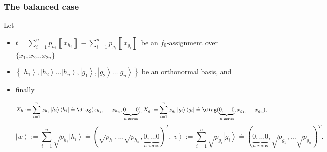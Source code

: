 \documentclass{article}
\begin{document}
\subsubsection{The balanced case}
\label{subsub:balancedf0algebraic}
\begin{proposition}
  \label{prop:balancedf0algeb}
  Let
  \begin{itemize}
    \item $
            t=\sum_{i=1}^{n}p_{h_{i}}\left\llbracket x_{h_{i}}\right\rrbracket -\sum_{i=1}^{n}p_{g_{i}}\left\llbracket x_{g_{i}}\right\rrbracket
          $ be an $f_{0}$-assignment over $\{x_{1},x_{2}\dots x_{2n}\}$

    \item $\left\{ \left|h_{1}\right\rangle ,\left|h_{2}\right\rangle \dots\left|h_{n}\right\rangle ,\left|g_{1}\right\rangle ,\left|g_{2}\right\rangle \dots\left|g_{n}\right\rangle \right\} $
          be an orthonormal basis, and
    \item finally
          \begin{footnotesize}
            \begin{displaymath}
              X_{h}:=\sum_{i=1}^{n}x_{h_{i}}\left|h_{i}\right\rangle \left\langle h_{i}\right|\doteq\diag(x_{h_{1}},\dots x_{h_{n}},\underbrace{0,\dots0}_{n\text{-zeros}}),
              X_{g}:=\sum_{i=1}^{n}x_{g_{i}}\left|g_{i}\right\rangle \left\langle g_{i}\right|\doteq\diag(\underbrace{0,\dots0}_{n\text{-zeros}},x_{g_{1}},\dots x_{g_{n}}),
            \end{displaymath}
            \begin{displaymath}
              \left|w\right\rangle :=\sum_{i=1}^{n}\sqrt{p_{h_{i}}}\left|h_{i}\right\rangle \doteq(\sqrt{p_{h_{1}}},\dots\sqrt{p_{h_{n}}},\underbrace{0,\dots0}_{n\text{-zeros}})^{T},
              \left|v\right\rangle :=\sum_{i=1}^{n}\sqrt{p_{g_{i}}}\left|g_{i}\right\rangle \doteq(\underbrace{0,\dots0}_{n\text{-zeros}},\sqrt{p_{g_{1}}},\dots\sqrt{p_{g_{n}}})^{T}.
            \end{displaymath}
          \end{footnotesize}


\end{itemize}
\end{proposition}
\end{document}
